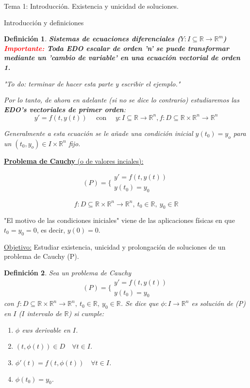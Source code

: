 \documentclass{article}
\newcommand{\cauchy}[0]{
    \[(P) = \biggl\{ 
            \begin{array}{c}
            y' = f(t,y(t)) \\
            y(t_0) = y_0
            \end{array}
    \]
}
\newcommand{\defcauchy}{f: D \subseteq \mathbb{R}\times \mathbb{R}^n \rightarrow\mathbb{R}^n, \ t_0\in \mathbb{R}, \ y_0\in \mathbb{R}}
\newtheorem{definition}{Definición}[section]
\begin{document}
\begin{section}{Tema 1: Introducción. Existencia y unicidad de soluciones.}
\begin{subsection}{Introducción y definiciones}
\begin{definition}{\textbf{Sistemas de ecuaciones diferenciales ($Y: I\subseteq \mathbb{R} \rightarrow \mathbb{R}^m$)}}
            \textbf{\textcolor{red}{Importante:} Toda EDO escalar de orden 'n' se puede transformar mediante un 'cambio de variable' en una ecuación vectorial de orden 1.}

            "To do: terminar de hacer esta parte y escribir el ejemplo."

            Por lo tanto, de ahora en adelante (si no se dice lo contrario) estudiaremos las \textbf{EDO's vectoriales de primer orden}:
            \[y' =f(t,y(t))\quad \text{ con }\quad y: I \subseteq \mathbb{R} \rightarrow \mathbb{R}^n, f:D \subseteq \mathbb{R} \times \mathbb{R}^n \rightarrow \mathbb{R}^n\]

            Generalmente a esta ecuación se le añade una condición inicial $y(t_0) = y_o$ para un $(t_0,y_o)\in I\times \mathbb{R}^n$ fijo.
        \end{definition}
	\end{subsection}

    \begin{subsection}{\underline{\textbf{Problema de Cauchy} (o de valores inciales):}}

        \cauchy

        \[f: D \subseteq \mathbb{R}\times \mathbb{R}^n \rightarrow\mathbb{R}^n, \ t_0\in \mathbb{R}, \ y_0\in \mathbb{R}\]
        
        "El motivo de las condiciones iniciales" viene de las aplicaciones físicas en que $t_0=y_0=0$, es decir, $y(0)=0$.

        \underline{Objetivo:} Estudiar existencia, unicidad y prolongación de soluciones de un problema de Cauchy (P).

        \begin{definition}
            Sea un problema de Cauchy \cauchy con $\defcauchy$. Se dice que $\phi: I \rightarrow \mathbb{R}^n$ es solución de (P) en $I$ ($I$ intervalo de $\mathbb{R}$)
            si cumple:

            \begin{enumerate}
                \item $\phi$ ews derivable en $I$.
                \item $(t, \phi(t))\in D \quad\forall t\in I$.
                \item $\phi'(t) = f(t, \phi(t))\quad\forall t\in I$.
                \item $\phi(t_0) = y_0$.
            \end{enumerate}
        \end{definition}


\end{subsection}
\end{section}
\end{document}
